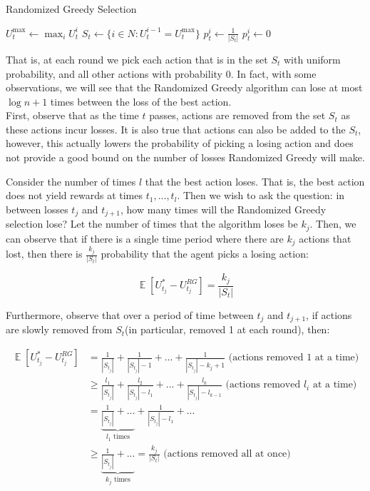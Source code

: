 \documentclass[12pt]{article}
\DeclareMathOperator{\E}{\mathbb{E}}
\begin{document}
\begin{algorithm}
\caption{Randomized Greedy Selection}\label{euclid}
\begin{algorithmic}[1]
	\State $U^{\max}_t \leftarrow \max_i U^i_t$
	\State $S_t \leftarrow \{ i \in N : U^{i-1}_t = U^{\max}_t\}$
		\State $p^i_t \leftarrow \frac{1}{|S_t|}$
	\Else
		\State $p^i_t \leftarrow 0$ 
	\EndIf
	\EndFor
\EndFor
\end{algorithmic}
\end{algorithm}

That is, at each round we pick each action that is in the set $S_t$ with uniform probability, and all other actions with probability 0. In fact, with some observations, we will see that the Randomized Greedy algorithm can lose at most $\log n + 1$ times between the loss of the best action. \\

First, observe that as the time $t$ passes, actions are removed from the set $S_t$ as these actions incur losses. It is also true that actions can also be added to the $S_t$, however, this actually lowers the probability of picking a losing action and does not provide a good bound on the number of losses Randomized Greedy will make.

Consider the number of times $l$ that the best action loses. That is, the best action does not yield rewards at times $t_1,..., t_l$. Then we wish to ask the question: in between losses $t_j$ and $t_{j+1}$, how many times will the Randomized Greedy selection lose? Let the number of times that the algorithm loses be $k_j$. Then, we can observe that if there is a single time period where there are $k_j$ actions that lost, then there is $\frac{k_j}{|S_t|}$ probability that the agent picks a losing action:

\begin{equation*}
\E[U^*_{t_j} - U^{RG}_{t_j}] = \frac{k_j}{|S_t|}
\end{equation*}

Furthermore, observe that over a period of time between $t_j$ and $t_{j+1}$, if actions are slowly removed from $S_t$(in particular, removed 1 at each round), then:

\begin{equation*}
\begin{aligned}
\E[U^*_{t_j} - U^{RG}_{t_j}] &= \frac{1}{|S_{t_j}|} + \frac{1}{|S_{t_j}| - 1} + ... + \frac{1}{|S_{t_j}| - k_j + 1} \text{ (actions removed 1 at a time)}\\ 
& \geq \frac{l_1}{|S_{t_j}|} + \frac{l_2}{|S_{t_j}| - l_1} + ... + \frac{l_k}{|S_{t_j}| - l_{k-1}} \text{ (actions removed $l_i$ at a time)}\\
&=   \underbrace{\frac{1}{|S_{t_j}|} + ...}_{l_1 \text{ times}} + \frac{1}{|S_{t_j}| - l_1} + ... \\
& \geq \underbrace{\frac{1}{|S_{t_j}|} + ...}_{k_j \text{ times}} = \frac{k_j}{|S_t|} \text{ (actions removed all at once)}
\end{aligned}
\end{equation*}
\end{document}
